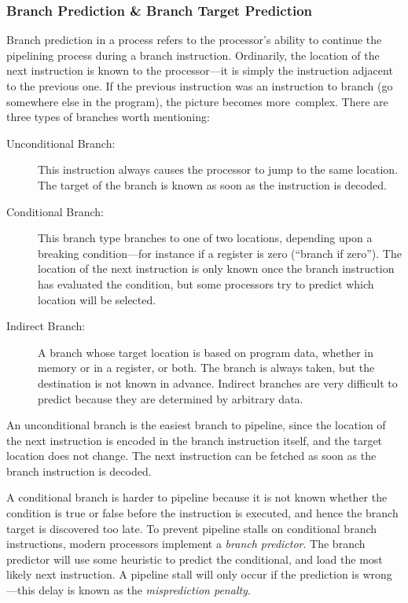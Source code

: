 			\subsubsection{Branch Prediction \& Branch Target Prediction}
			Branch prediction in a process refers to the processor's ability to continue the pipelining process during a branch instruction. Ordinarily, the location of the next instruction is known to the processor---it is simply the instruction adjacent to the previous one. If the previous instruction was an instruction to branch (go somewhere else in the program), the picture becomes more~complex. There are three types of branches worth mentioning:
			\par\nobreak\makeatletter\@afterheading\makeatother
			\begin{description}
				\item[Unconditional Branch:] This instruction always causes the processor to jump to the same location. The target of the branch is known as soon as the instruction is decoded.
				\item[Conditional Branch:] This branch type branches to one of two locations, depending upon a breaking condition---for instance if a register is zero (``branch if zero''). The location of the next instruction is only known once the branch instruction has evaluated the condition, but some processors try to predict which location will be selected.
				\item[Indirect Branch:] A branch whose target location is based on program data, whether in memory or in a register, or both. The branch is always taken, but the destination is not known in advance. Indirect branches are very difficult to predict because they are determined by arbitrary data.
			\end{description}
			
			An unconditional branch is the easiest branch to pipeline, since the location of the next instruction is encoded in the branch instruction itself, and the target location does not change. The next instruction can be fetched as soon as the branch instruction is decoded. 
			
			A conditional branch is harder to pipeline because it is not known whether the condition is true or false before the instruction is executed, and hence the branch target is discovered too late. To prevent pipeline stalls on conditional branch instructions, modern processors implement a \emph{branch predictor}. The branch predictor will use some heuristic to predict the conditional, and load the most likely next instruction. A pipeline stall will only occur if the prediction is wrong---this delay is known as the \emph{misprediction penalty}.
			
